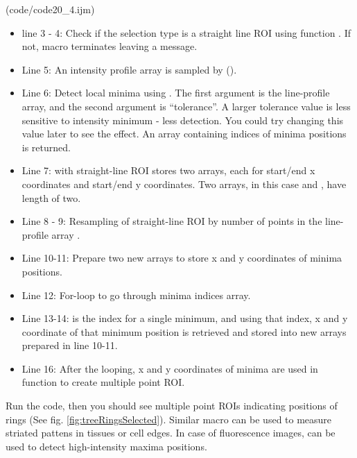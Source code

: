 (code/code20_4.ijm)

\begin{itemize}
\item line 3 - 4:  Check if the selection type is a straight line ROI using function . If not, macro terminates leaving a message.
\item Line 5: An intensity profile array  is sampled by ().
\item Line 6: Detect local minima using . The first argument is the line-profile array, and the second argument is ``tolerance''. A larger tolerance value is less sensitive to intensity minimum - less detection. You could try changing this value later to see the effect. An array containing indices of minima positions is returned. 
\item Line 7:  with straight-line ROI stores two arrays, each for start/end x coordinates and start/end y coordinates. Two arrays, in this case  and , have length of two. 
\item Line 8 - 9: Resampling of straight-line ROI by number of points in the line-profile array .
\item Line 10-11: Prepare two new arrays to store x and y coordinates of minima positions. 
\item Line 12: For-loop to go through minima indices array. 
\item Line 13-14:  is the index for a single minimum, and using that index, x and y coordinate of that minimum position is retrieved and stored into new arrays prepared in line 10-11. 
\item Line 16: After the looping, x and y coordinates of minima are used in  function to create multiple point ROI. 
\end{itemize}

Run the code, then you should see multiple point ROIs indicating positions of rings (See fig. \ref{fig:treeRingsSelected}). Similar macro can be used to measure striated pattens in tissues or cell edges. In case of fluorescence images,  can be used to detect high-intensity maxima positions.